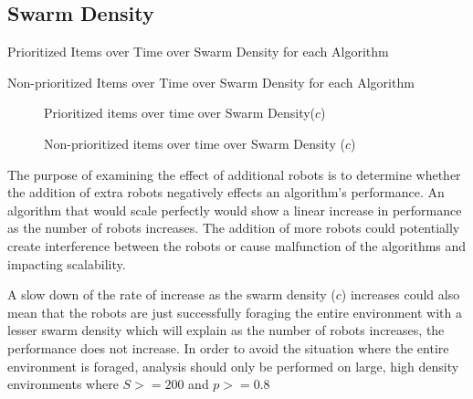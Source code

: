 \subsection{Swarm Density}
\label{results:numberenvironments}

\begin{table} [h]
     \caption{Prioritized Items over Time over Swarm Density for each Algorithm}
     \label{specializationprioritized}
	\centering
	\footnotesize
	
\end{table}

\begin{table} [h]
     \caption{Non-prioritized Items over Time over Swarm Density for each Algorithm}
     \label{specializationnonprioritized}
	\centering
	\footnotesize
	
\end{table}


\begin{figure}[!htb]
\centering
\resizebox{\textwidth}{!}{}
\caption{Prioritized items over time over Swarm Density($c$)}
\label{robotsgoldplot}
\end{figure}

\begin{figure}[!htb]
\centering
\resizebox{\textwidth}{!}{}
\caption{Non-prioritized items over time over Swarm Density ($c$)}
\label{robotswasteplot}
\end{figure}

The purpose of examining the effect of additional robots is to determine whether the addition of extra robots negatively effects an algorithm's performance. An algorithm that would scale perfectly would show a linear increase in performance as the number of robots increases. The addition of more robots could potentially create interference between the robots or cause malfunction of the algorithms and impacting scalability. 

A slow down of the rate of increase as the swarm density ($c$) increases could also mean that the robots are just successfully foraging the entire environment with a lesser swarm density which will explain as the number of robots increases, the performance does not increase. In order to avoid the situation where the entire environment is foraged, analysis should only be performed on large, high density environments where $S >= 200$ and $p >= 0.8$

